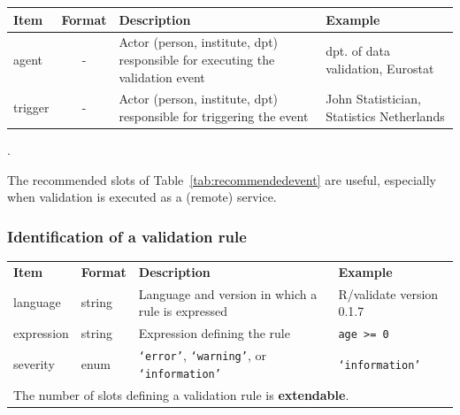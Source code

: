 \documentclass[a4paper, 11pt]{article}
\newcommand{\code}[1]{\texttt{#1}}
\begin{document}
\begin{center}
\begin{tabular}{|lp{15mm}p{}p{}|}
\hline
\textbf{Item} & \textbf{Format} & \textbf{Description} &\textbf{Example}\\
\hline
agent   & \multicolumn{1}{c}{-} & Actor (person, institute, dpt) responsible for executing the validation event & dpt. of data validation, Eurostat\\
trigger & \multicolumn{1}{c}{-} & Actor (person, institute, dpt) responsible for triggering the event  & John Statistician, Statistics Netherlands\\
\hline
\end{tabular}
\label{tab:recommendedevent}.
\end{center}
The recommended slots of Table~\ref{tab:recommendedevent} are useful, especially when validation is executed as a (remote) service.


\subsubsection{Identification of a validation rule}
%
\begin{center}
\begin{tabular}{|lp{15mm}p{}p{}|}
\hline
\textbf{Item} & \textbf{Format} & \textbf{Description} &\textbf{Example}\\
language      & string   & Language and version in which a rule is expressed & R/validate version 0.1.7\\
expression    & string   & Expression defining the rule           & \code{age >= 0}\\
severity      & enum     & \code{`error'}, \code{`warning'},
                           or \code{`information'}                & \code{`information'}\\ 

\hline
\multicolumn{4}{|l|}{The number of slots defining a validation rule is \textbf{extendable}.
}\\
\hline
\end{tabular}
\end{center}


\end{document}
